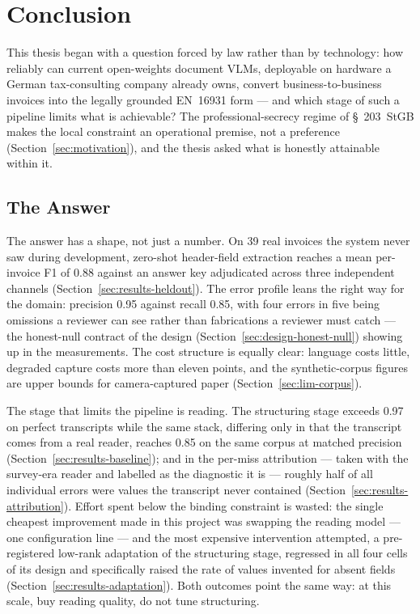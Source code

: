 \chapter{Conclusion}
\label{ch:conclusion}


This thesis began with a question forced by law rather than by technology: how reliably
can current open-weights document \acp{VLM}, deployable on hardware a German tax-consulting
company already owns, convert business-to-business invoices into the legally grounded
\ac{EN}~16931 form --- and which stage of such a pipeline limits what is achievable? The
professional-secrecy regime of \S~203~\ac{StGB} makes the local constraint an operational
premise, not a preference (Section~\ref{sec:motivation}), and the thesis asked what is
honestly attainable within it.

\section*{The Answer}

The answer has a shape, not just a number. On 39 real invoices the system never saw
during development, zero-shot header-field extraction reaches a mean per-invoice
\ac{F1} of 0.88 against an answer key adjudicated across three independent channels
(Section~\ref{sec:results-heldout}). The error profile leans the right way for the domain:
precision 0.95 against recall 0.85, with four errors in five being omissions a reviewer
can see rather than fabrications a reviewer must catch --- the honest-null contract of
the design (Section~\ref{sec:design-honest-null}) showing up in the measurements. The cost
structure is equally clear: language costs little, degraded capture costs more than
eleven points, and the synthetic-corpus figures are upper bounds for camera-captured
paper (Section~\ref{sec:lim-corpus}).

The stage that limits the pipeline is reading. The structuring stage exceeds 0.97 on
perfect transcripts while the same stack, differing only in that the transcript
comes from a real reader, reaches 0.85 on the same corpus at matched precision
(Section~\ref{sec:results-baseline}); and in the per-miss attribution --- taken with the
survey-era reader and labelled as the diagnostic it is --- roughly half of all
individual errors were values the transcript never contained
(Section~\ref{sec:results-attribution}). Effort spent
below the binding constraint is wasted: the single cheapest improvement made in this
project was swapping the reading model --- one configuration line --- and the most
expensive intervention attempted, a pre-registered low-rank adaptation of the
structuring stage, regressed in all four cells of its design and specifically raised
the rate of values invented for absent fields (Section~\ref{sec:results-adaptation}).
Both outcomes point the same way: at this scale, buy reading quality, do not tune
structuring.

